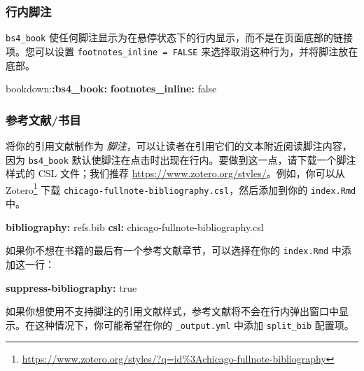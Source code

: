 \documentclass[
  12pt,
]{krantz}
\newenvironment{Shaded}{\begin{snugshade}}{\end{snugshade}}
\newcommand{\AttributeTok}[1]{\textcolor[rgb]{0.13,0.29,0.53}{#1}}
\newcommand{\CharTok}[1]{\textcolor[rgb]{0.31,0.60,0.02}{#1}}
\newcommand{\FunctionTok}[1]{\textcolor[rgb]{0.13,0.29,0.53}{\textbf{#1}}}
\newcommand{\KeywordTok}[1]{\textcolor[rgb]{0.13,0.29,0.53}{\textbf{#1}}}
\renewcommand{\href}[2]{#2\footnote{\url{#1}}}
\theoremstyle{definition}
\theoremstyle{definition}
\theoremstyle{definition}
\theoremstyle{definition}
\theoremstyle{remark}
\begin{document}
\subsubsection{行内脚注}\label{bs4-book-footnotes}

\texttt{bs4\_book} 使任何脚注显示为在悬停状态下的行内显示，而不是在页面底部的链接项。您可以设置 \texttt{footnotes\_inline\ =\ FALSE} 来选择取消这种行为，并将脚注放在底部。

\begin{Shaded}
\begin{Highlighting}[]
\AttributeTok{bookdown:}\FunctionTok{:bs4\_book}\KeywordTok{:}
\AttributeTok{  }\FunctionTok{footnotes\_inline}\KeywordTok{:}\AttributeTok{ }\CharTok{false}
\end{Highlighting}
\end{Shaded}

\subsubsection{参考文献/书目}\label{ux53c2ux8003ux6587ux732eux4e66ux76ee}

将你的引用文献制作为 \emph{脚注}，可以让读者在引用它们的文本附近阅读脚注内容，因为 \texttt{bs4\_book} 默认使脚注在点击时出现在行内。要做到这一点，请下载一个脚注样式的 CSL 文件；我们推荐 \url{https://www.zotero.org/styles/}。例如，你可以从 \href{https://www.zotero.org/styles/?q=id\%3Achicago-fullnote-bibliography}{Zotero} 下载 \texttt{chicago-fullnote-bibliography.csl}，然后添加到你的 \texttt{index.Rmd} 中。

\begin{Shaded}
\begin{Highlighting}[]
\FunctionTok{bibliography}\KeywordTok{:}\AttributeTok{ refs.bib}
\FunctionTok{csl}\KeywordTok{:}\AttributeTok{ chicago{-}fullnote{-}bibliography.csl}
\end{Highlighting}
\end{Shaded}

如果你不想在书籍的最后有一个参考文献章节，可以选择在你的 \texttt{index.Rmd} 中添加这一行：

\begin{Shaded}
\begin{Highlighting}[]
\FunctionTok{suppress{-}bibliography}\KeywordTok{:}\AttributeTok{ }\CharTok{true}
\end{Highlighting}
\end{Shaded}

如果你想使用不支持脚注的引用文献样式，参考文献将不会在行内弹出窗口中显示。在这种情况下，你可能希望在你的 \texttt{\_output.yml} 中添加 \texttt{split\_bib} 配置项。
\end{document}
